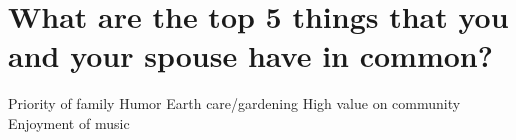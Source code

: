 \section{What are the top 5 things that you and your spouse have in common?}
Priority of family
Humor
Earth care/gardening
High value on community
Enjoyment of music





